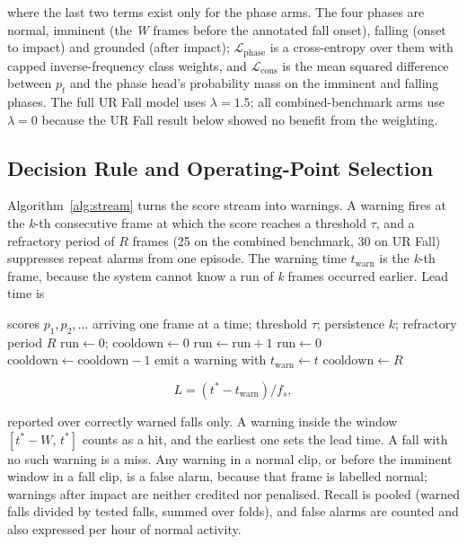 \documentclass[journal]{IEEEtran}
\begin{document}
where the last two terms exist only for the phase arms. The four phases are normal, imminent (the \textit{W} frames before the annotated fall onset), falling (onset to impact) and grounded (after impact); $\mathcal{L}_{\mathrm{phase}}$ is a cross-entropy over them with capped inverse-frequency class weights, and $\mathcal{L}_{\mathrm{cons}}$ is the mean squared difference between $p_t$ and the phase head's probability mass on the imminent and falling phases. The full UR Fall model uses $\lambda = 1.5$; all combined-benchmark arms use $\lambda = 0$ because the UR Fall result below showed no benefit from the weighting.


\subsection{Decision Rule and Operating-Point Selection}\label{sub:decision}

Algorithm~\ref{alg:stream} turns the score stream into warnings. A warning fires at the \textit{k}-th consecutive frame at which the score reaches a threshold $\tau$, and a refractory period of $R$ frames (25 on the combined benchmark, 30 on UR Fall) suppresses repeat alarms from one episode. The warning time $t_{\mathrm{warn}}$ is the \textit{k}-th frame, because the system cannot know a run of \textit{k} frames occurred earlier. Lead time is

\begin{algorithm*}[!t]
\caption{Streaming warning generation (one clip).}
\label{alg:stream}
\begin{algorithmic}[1]
\REQUIRE scores $p_1, p_2, \dots$ arriving one frame at a time; threshold $\tau$; persistence $k$; refractory period $R$
\STATE $\text{run} \leftarrow 0$; $\text{cooldown} \leftarrow 0$
\STATE $\text{run} \leftarrow \text{run}+1$
\ELSE
\STATE $\text{run} \leftarrow 0$
\ENDIF
{}
\STATE $\text{cooldown} \leftarrow \text{cooldown}-1$ 
\STATE emit a warning with $t_{\mathrm{warn}} \leftarrow t$
\STATE $\text{cooldown} \leftarrow R$
\ENDIF
\ENDFOR
\end{algorithmic}
\end{algorithm*}

\begin{equation}
\label{eq:lead}
L = (t^{*} - t_{\mathrm{warn}})/f_s,
\end{equation}


reported over correctly warned falls only. A warning inside the window $[t^{*}-W,\,t^{*}]$ counts as a hit, and the earliest one sets the lead time. A fall with no such warning is a miss. Any warning in a normal clip, or before the imminent window in a fall clip, is a false alarm, because that frame is labelled normal; warnings after impact are neither credited nor penalised. Recall is pooled (warned falls divided by tested falls, summed over folds), and false alarms are counted and also expressed per hour of normal activity.
\end{document}

